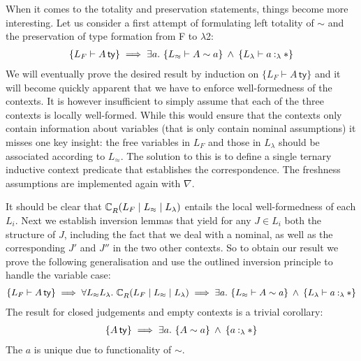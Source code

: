 \documentclass[a4paper,UKenglish]{lipics-v2016}
\newcommand{\ms}{\,}
\newcommand{\mrel}[1]{\mathrel{\ms #1 \ms}}
\newcommand{\mAnd}{\mrel{\wedge}}
\newcommand{\mAll}[1]{\ensuremath{\forall} #1.\ms\ms}
\newcommand{\mEx}[1]{\ensuremath{\exists} #1.\ms\ms}
\newcommand{\SysL}{$\lambda$2\xspace}
\newcommand{\istyFh}[1]{\ensuremath{#1\ms\mathsf{ty}}}
\newcommand{\typingFh}[2]{\ensuremath{#1 \mathbin{:_{F}} #2}}
\newcommand{\typingLh}[2]{\ensuremath{#1 \mathbin{:_{\lambda}} #2}}
\newcommand{\tyr}{\mathrel{\sim}}
\newcommand{\tmr}{\mathrel{\approx}}
\newcommand{\Prp}{\ensuremath{\textrm{\textasteriskcentered}}}
\newcommand{\emptyctx}{\ensuremath{\bullet}}
\theoremstyle{plain}
\begin{document}
When it comes to the totality and preservation statements, things become more interesting.
Let us consider a first attempt of formulating left totality of $\tyr$ and the preservation of type formation from F to \SysL:
\begin{align*}
  \{L_{F} \vdash \istyFh{A}\} \implies \mEx{a} \{ L_{\tmr} \vdash A \tyr a \} \mAnd \{L_{\lambda} \vdash \typingLh{a}{\Prp}\}
\end{align*}
We will eventually prove the desired result by induction on $\{L_{F} \vdash \istyFh{A}\}$ and it will become quickly apparent that we have to enforce well-formedness of the contexts.
It is however insufficient to simply assume that each of the three contexts is locally well-formed.
While this would ensure that the contexts only contain information about variables (that is only contain nominal assumptions) it misses one key insight: the free variables in $L_{F}$ and those in $L_{\lambda}$ should be associated according to $L_{\tmr}$.
The solution to this is to define a single ternary inductive context predicate that establishes the correspondence.
The freshness assumptions are implemented again with $\nabla$.
\newcommand{\acR}[3]{\ac{R}{~}{#1 \mid #2 \mid #3}}
It should be clear that $\acR{L_{F}}{L_{\tmr}}{L_{\lambda}}$ entails the local well-formedness of each $L_i$.
Next we establish inversion lemmas that yield for any $J \in L_i$ both the structure of $J$, including the fact that we deal with a nominal, as well as the corresponding $J'$ and $J''$ in the two other contexts.
So to obtain our result we prove the following generalisation and use the outlined inversion principle to handle the variable case:
\begin{align*}
  \{L_{F} \vdash \istyFh{A}\} \implies \mAll{L_{\tmr}L_{\lambda}} \acR{L_{F}}{L_{\tmr}}{L_{\lambda}} \implies \mEx{a} \{ L_{\tmr} \vdash A \tyr a \} \mAnd \{L_{\lambda} \vdash \typingLh{a}{\Prp}\}
\end{align*}
The result for closed judgements and empty contexts is a trivial corollary:
\begin{align*}
  \{\istyFh{A}\} \implies \mEx{a} \{ A \tyr a \} \mAnd \{\typingLh{a}{\Prp}\}
\end{align*}
The $a$ is unique due to functionality of $\tyr$.
\end{document}
